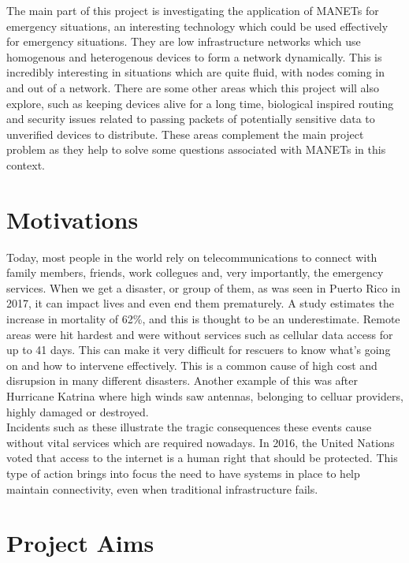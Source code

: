 \documentclass{report}
\begin{document}
The main part of this project is investigating the application of MANETs for emergency situations, an interesting technology which could be used
effectively for emergency situations. They are low infrastructure networks which use homogenous and heterogenous devices to form a 
network dynamically. This is incredibly interesting in situations which are quite fluid, with nodes coming in and out of a network\cite{sun2001mobile}. 
There are some other areas which this project will also explore, such as keeping devices alive for a long time, biological 
inspired routing and security issues related to passing packets of potentially sensitive data to unverified devices to distribute. These areas complement 
the main project problem as they help to solve some questions associated with MANETs in this context.


\section*{Motivations}
Today, most people in the world rely on telecommunications to connect with family members, friends, 
work collegues and, very importantly, the emergency services. When we get a disaster, or group of them, as was 
seen in Puerto Rico in 2017, it can impact lives and even end them prematurely. A study estimates the increase in 
mortality of 62\%\cite{kishore2018mortality}, and this is thought to be an underestimate. Remote areas were hit hardest and were without services 
such as cellular data access for up to 41 days. This can make it very difficult for rescuers to know what's going on and how to intervene 
effectively. This is a common cause of high cost and disrupsion in many different disasters. 
Another example of this was after Hurricane Katrina\cite{banipal2006strategic} where high winds saw antennas, belonging to celluar 
providers, highly damaged or destroyed. 
\bigskip\\
Incidents such as these illustrate the tragic consequences these events cause without vital services which are required nowadays. 
In 2016, the United Nations voted that access to the internet is a human right that should be protected\cite{UNResolutionJune2016}. 
This type of action brings into focus the need to have systems in place to help maintain connectivity, even when traditional infrastructure 
fails. 

\section*{Project Aims}
\end{document}
